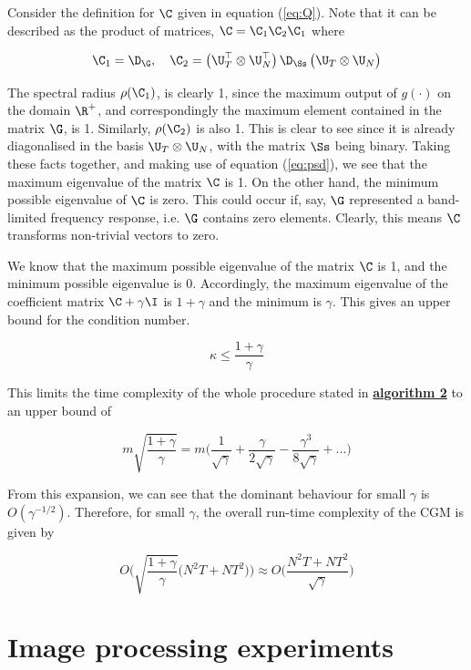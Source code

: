 Consider the definition for $\C$ given in equation (\ref{eq:Q}). Note that it can be described as the product of matrices, $\C = \C_1 \C_2 \C_1$ where 
 
 $$
 \C_1 = \D_{\G}, \quad \C_2 = \big(\U_T^\top \otimes \U_N^\top \big)\, \D_{\Ss} \, \big(\U_T \otimes \U_N \big)
 $$
 
The spectral radius $\rho(\C_1)$, is clearly 1, since the maximum output of $g(\cdot)$ on the domain $\R^{+}$, and correspondingly the maximum element contained in the matrix $\G$, is 1. Similarly, $\rho(\C_2)$ is also 1. This is clear to see since it is already diagonalised in the basis $\U_T \otimes \U_N$, with the matrix $\Ss$ being binary.  Taking these facts together, and making use of equation (\ref{eq:psd}), we see that the maximum eigenvalue of the matrix $\C$ is 1. On the other hand, the minimum possible eigenvalue of $\C$ is zero. This could occur if, say, $\G$ represented a band-limited frequency response, i.e. $\G$ contains zero elements. Clearly, this means $\C$ transforms non-trivial vectors to zero. 

We know that the maximum possible eigenvalue of the matrix $\C$ is 1, and the minimum possible eigenvalue is $0$. Accordingly, the maximum eigenvalue of the coefficient matrix $\C + \gamma \I$ is $1 + \gamma$ and the minimum is $\gamma$. This gives an upper bound for the condition number. 
 
\begin{equation}
 \kappa \leq \frac{1 + \gamma}{\gamma}
\end{equation}
 
This limits the time complexity of the whole procedure stated in \hyperlink{al2}{\textbf{algorithm 2}} to an upper bound of 

$$
m \sqrt{\frac{1 + \gamma}{\gamma}} = m \Big( \frac{1}{\sqrt{\gamma}} + \frac{\gamma}{2\sqrt{\gamma}}  - \frac{\gamma^3}{8\sqrt{\gamma}} + ... \Big)
$$

From this expansion, we can see that the dominant behaviour for small $\gamma$ is $O(\gamma^{-1/2})$. Therefore, for small $\gamma$, the overall run-time complexity of the CGM is given by 

\begin{equation}
\label{eq:OCGM}
O\Bigg(\sqrt{\frac{1 + \gamma}{\gamma}}\big(N^2T + NT^2\big) \Bigg) \approx O\Bigg(\frac{N^2T + NT^2}{\sqrt{\gamma}} \Bigg)
\end{equation}

\section{Image processing experiments}

